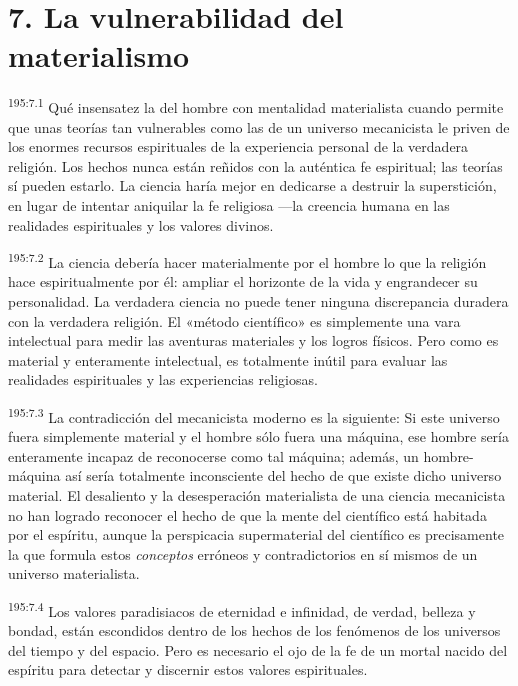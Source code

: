 \section*{7. La vulnerabilidad del materialismo}
\par 
\textsuperscript{195:7.1} Qué insensatez la del hombre con mentalidad materialista cuando permite que unas teorías tan vulnerables como las de un universo mecanicista le priven de los enormes recursos espirituales de la experiencia personal de la verdadera religión. Los hechos nunca están reñidos con la auténtica fe espiritual; las teorías sí pueden estarlo. La ciencia haría mejor en dedicarse a destruir la superstición, en lugar de intentar aniquilar la fe religiosa ---la creencia humana en las realidades espirituales y los valores divinos.

\par 
\textsuperscript{195:7.2} La ciencia debería hacer materialmente por el hombre lo que la religión hace espiritualmente por él: ampliar el horizonte de la vida y engrandecer su personalidad. La verdadera ciencia no puede tener ninguna discrepancia duradera con la verdadera religión. El «método científico» es simplemente una vara intelectual para medir las aventuras materiales y los logros físicos. Pero como es material y enteramente intelectual, es totalmente inútil para evaluar las realidades espirituales y las experiencias religiosas.

\par 
\textsuperscript{195:7.3} La contradicción del mecanicista moderno es la siguiente: Si este universo fuera simplemente material y el hombre sólo fuera una máquina, ese hombre sería enteramente incapaz de reconocerse como tal máquina; además, un hombre-máquina así sería totalmente inconsciente del hecho de que existe dicho universo material. El desaliento y la desesperación materialista de una ciencia mecanicista no han logrado reconocer el hecho de que la mente del científico está habitada por el espíritu, aunque la perspicacia supermaterial del científico es precisamente la que formula estos \textit{conceptos} erróneos y contradictorios en sí mismos de un universo materialista.

\par 
\textsuperscript{195:7.4} Los valores paradisiacos de eternidad e infinidad, de verdad, belleza y bondad, están escondidos dentro de los hechos de los fenómenos de los universos del tiempo y del espacio. Pero es necesario el ojo de la fe de un mortal nacido del espíritu para detectar y discernir estos valores espirituales.

